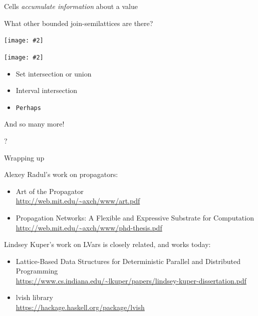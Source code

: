 \documentclass[usenames,dvipsnames,svgnames,table,aspectratio=1610,mathserif]{beamer}
\newcommand{\nl}{\vspace{\baselineskip}}
\newcommand{\pnl}{\pause \nl}
\newcommand{\textslide}[1]{{
\begin{frame}
\begin{center}

#1

\end{center}
\end{frame}
}}
\newcommand{\textslideleft}[1]{{
\begin{frame}

#1

\end{frame}
}}
\newcommand{\imageslide}[2][1]{{
\begin{frame}\begin{center}
\texttt{[image: \#2]}
\end{center}\end{frame}
}}
\begin{document}




\textslide{\Large{Cells {\it accumulate information} about a value}}









\textslide{
  What other bounded join-semilattices are there?
}

\imageslide[0.7]{powerset.pdf}
\imageslide[0.7]{powerset-upside-down.pdf}

\textslideleft{

  \begin{itemize}
    \item Set intersection or union
    \item Interval intersection
    \item {\tt Perhaps}
  \end{itemize}

  \nl

  And so many more!

  \pnl

}





\textslide{\centering {\Huge ?}}




\textslide{\Huge{Wrapping up}}


\begin{frame}

Alexey Radul's work on propagators:

\begin{itemize}
\item Art of the Propagator \\
      \url{http://web.mit.edu/~axch/www/art.pdf}
\item Propagation Networks: A Flexible and Expressive Substrate for Computation \\
      \url{http://web.mit.edu/~axch/www/phd-thesis.pdf}
\end{itemize}
\end{frame}


\textslideleft{

Lindsey Kuper's work on LVars is closely related, and works today:

\begin{itemize}
\item Lattice-Based Data Structures for Deterministic Parallel and Distributed Programming \\
      \url{https://www.cs.indiana.edu/~lkuper/papers/lindsey-kuper-dissertation.pdf}
\item lvish library \\
      \url{https://hackage.haskell.org/package/lvish}
\end{itemize}

}
\end{document}

